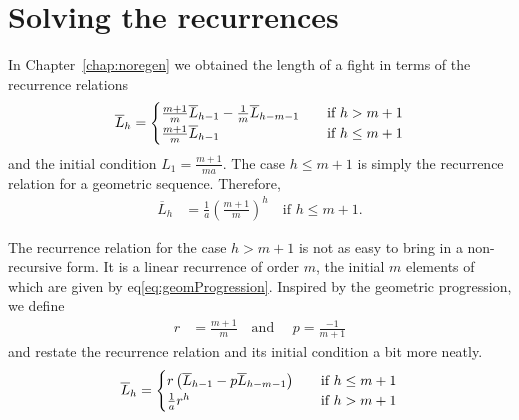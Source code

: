 \section{Solving the recurrences}\label{chap:recurrenceAnalysis}

In Chapter~\ref{chap:noregen} we obtained the length of a fight in terms of the recurrence relations
\begin{align}\label{eq:complexRecurrence1}
	\overline{L}_h = \begin{cases}
        \frac{m+1}{m}\overline{L}_{h-1} - \frac{1}{m}\overline{L}_{h-m-1} &\quad \mbox{if } h > m+1\\
        \frac{m+1}{m}\overline{L}_{h-1} &\quad \mbox{if } h \leq m+1
    \end{cases}
\end{align}
and the initial condition $L_1 = \frac{m+1}{ma}$. The case $h \leq m+1$ is simply the recurrence relation for a geometric sequence. Therefore,
\begin{align}
    \overline{L}_h &= \frac{1}{a} {\left( \frac{m+1}{m} \right)}^h \quad \mbox{if } h \leq m+1.\label{eq:geomProgression}
\end{align}

The recurrence relation for the case $h > m+1$ is not as easy to bring in a non-recursive form. It is a linear recurrence of order $m$, the initial $m$ elements of which are given by eq\ref{eq:geomProgression}. Inspired by the geometric progression, we define
\begin{align}
	r &= \frac{m+1}{m} \quad \mbox{and } \quad p = \frac{-1}{m+1}
\end{align}
and restate the recurrence relation and its initial condition a bit more neatly.
\begin{align}\label{eq:complexRecurrence2}
	\overline{L}_h = \begin{cases}
        r\left(\overline{L}_{h-1} - p\overline{L}_{h-m-1}\right) &\quad \mbox{if } h \leq m+1\\
        \frac{1}{a}r^h &\quad \mbox{if } h > m+1
    \end{cases}
\end{align}

